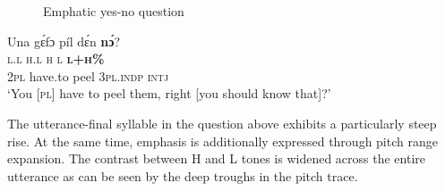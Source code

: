 \begin{figure}
\caption{Emphatic yes-no question}
\label{fig:key:3.44}
\end{figure}

  
 


\ea%
    \label{ex:key:97}
    \glll   Una    gɛ́fɔ    píl    dɛ́n    \textbf{nɔ́}?\\
\textsc{l.l}    \textsc{h.l}    \textsc{h}    \textsc{l}    \textbf{\textsc{l+h\%}}\\
\textsc{2pl}    have.to  peel    \textsc{3pl.indp}  \textsc{intj}\\
\glt ‘You [\textsc{pl}] have to peel them, right [you should know that]?’
\z



The utterance-final syllable in the question above exhibits a particularly steep rise. At the same time, emphasis is additionally expressed through pitch range expansion. The contrast between H and L tones is widened across the entire utterance as can be seen by the deep troughs in the pitch trace.

